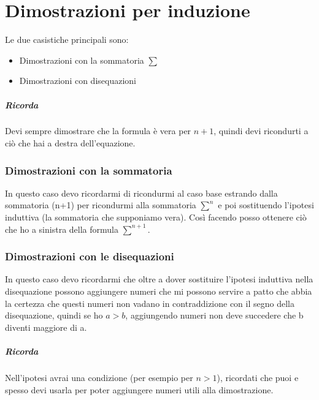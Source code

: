 \documentclass[12pt, a4paper, openany]{book}
\begin{document}
\chapter{Dimostrazioni per induzione}
Le due casistiche principali sono:
\begin{itemize}
	\item Dimostrazioni con la sommatoria $\sum$
	\item Dimostrazioni con disequazioni
\end{itemize}
\paragraph*{Ricorda} Devi sempre dimostrare che la formula è vera per $n+1$, quindi devi ricondurti a
ciò che hai a destra dell'equazione.

\subsection*{Dimostrazioni con la sommatoria}
In questo caso devo ricordarmi di ricondurmi al caso base estrando dalla sommatoria (n+1)
per ricondurmi alla sommatoria $\sum^n$ e poi sostituendo l'ipotesi induttiva
(la sommatoria che supponiamo vera). Così facendo posso ottenere ciò che ho a sinistra della
formula $\sum^{n+1}$.
\subsection*{Dimostrazioni con le disequazioni}
In questo caso devo ricordarmi che oltre a dover sostituire l'ipotesi induttiva nella disequazione
possono aggiungere numeri che mi possono servire a patto che abbia la certezza che questi numeri non
vadano in contraddizione con il segno della disequazione, quindi se ho $a>b$, aggiungendo numeri non deve succedere
che b diventi maggiore di a.
\paragraph*{Ricorda} Nell'ipotesi avrai una condizione (per esempio per $n>1$), ricordati che puoi e spesso
devi usarla per poter aggiungere numeri utili alla dimostrazione.
\end{document}
